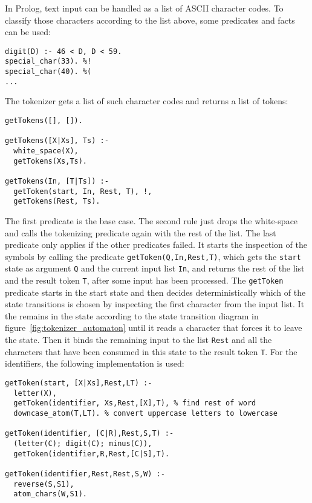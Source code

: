 In Prolog, text input can be handled as a list of ASCII character codes. To classify those characters according to the list above, some predicates and facts can be used:

\begin{lstlisting}
digit(D) :- 46 < D, D < 59.
special_char(33). %!
special_char(40). %(
...
\end{lstlisting}

The tokenizer gets a list of such character codes and returns a list of tokens:

\begin{lstlisting}
getTokens([], []).

getTokens([X|Xs], Ts) :- 
  white_space(X),
  getTokens(Xs,Ts). 
  
getTokens(In, [T|Ts]) :- 
  getToken(start, In, Rest, T), !, 
  getTokens(Rest, Ts).
\end{lstlisting}

The first predicate is the base case. The second rule just drops the white-space and calls the tokenizing predicate again with the rest of the list. The last predicate only applies if the other predicates failed. It starts the inspection of the symbols by calling the predicate \lstinline|getToken(Q,In,Rest,T)|, which gets the \lstinline|start| state as argument \lstinline|Q| and the current input list \lstinline|In|, and returns the rest of the list and the result token \lstinline|T|, after some input has been processed. The \lstinline|getToken| predicate starts in the start state and then decides deterministically which of the state transitions is chosen by inspecting the first character from the input list. It the remains in the state according to the state transition diagram in figure~\ref{fig:tokenizer_automaton} until it reads a character that forces it to leave the state. Then it binds the remaining input to the list \lstinline|Rest| and all the characters that have been consumed in this state to the result token \lstinline|T|. For the identifiers, the following implementation is used:

\begin{lstlisting}
getToken(start, [X|Xs],Rest,LT) :-
  letter(X), 
  getToken(identifier, Xs,Rest,[X],T), % find rest of word
  downcase_atom(T,LT). % convert uppercase letters to lowercase
  
getToken(identifier, [C|R],Rest,S,T) :-
  (letter(C); digit(C); minus(C)), 
  getToken(identifier,R,Rest,[C|S],T).
  
getToken(identifier,Rest,Rest,S,W) :-
  reverse(S,S1),
  atom_chars(W,S1). 
\end{lstlisting}

